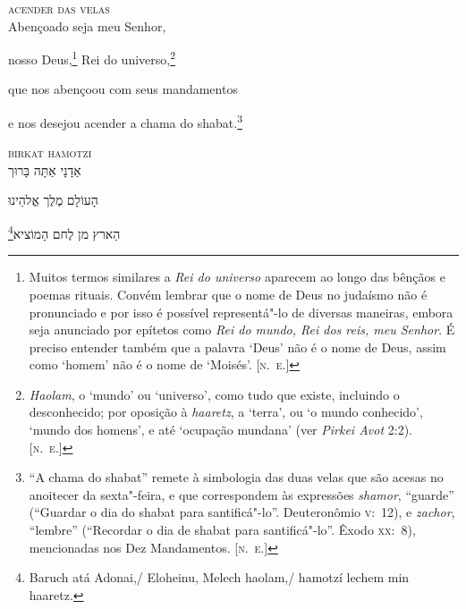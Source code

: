\vspace*{1cm}

\textsc{acender das velas}\\[15pt]

Abençoado seja meu Senhor,

nosso Deus,\footnote{
		Muitos termos similares a \textit{Rei do universo} aparecem
		ao longo das bênçãos e poemas rituais. Convém lembrar que o nome de Deus
		no judaísmo não é pronunciado e por isso é possível
		representá"-lo de diversas maneiras, embora seja anunciado por
		epítetos como \textit{Rei do mundo, Rei dos reis, meu Senhor}.
		É preciso entender também que a palavra `Deus' não é o nome de
		Deus, assim como `homem' não é o nome de `Moisés'. [\textsc{n.~e.}]} 
Rei do universo,\footnote{\textit{Haolam}, o `mundo' ou `universo', como tudo
		que existe, incluindo o desconhecido; por oposição à \textit{haaretz},
		a `terra', ou `o mundo conhecido', `mundo dos homens', e até `ocupação
		mundana' (ver \textit{Pirkei Avot} 2:2). [\textsc{n.~e.}]}

que nos abençoou com seus mandamentos

e nos desejou acender a chama do shabat.\footnote{``A chama do shabat'' remete à simbologia das duas velas
	que são acesas no anoitecer da sexta"-feira, e que correspondem às
	expressões \emph{shamor}, ``guarde'' (``Guardar o dia do
	shabat para santificá"-lo''. Deuteronômio \textsc{v}:~12),
	e \emph{zachor}, ``lembre''
	(``Recordar o dia de shabat para santificá"-lo''. Êxodo
	\textsc{xx}:~8), mencionadas nos Dez Mandamentos. [\textsc{n.~e.}]}

\movetoevenpage
\raggedleft


\vspace*{1cm}

\textsc{birkat hamotzi}\\[15pt]

אַדָנָי אַתָּה בָּרוּך

הָעוֹלָם מֶלֶך אֱלהֵינוּ 

\footnote{Baruch atá Adonai,/ Eloheinu, Melech haolam,/ hamotzí lechem min haaretz.}הַארץ מן לֶחם הָמוֹציא

\movetooddpage
\raggedright

